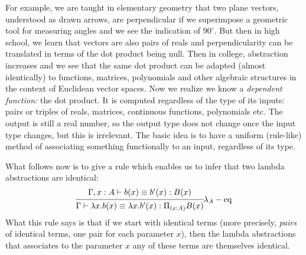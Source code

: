 For example, we are taught in elementary geometry that two plane vectors,
understood as drawn arrows, are perpendicular if we superimpose a geometric
tool for measuring angles and we see the indication of $ 90^\circ $.
But then in high school, we learn that vectors are also pairs of reals
and perpendicularity can be translated in terms of the dot product
being null. Then in college, abstraction increases and we see that the
same dot product can be adapted (almost identically) to functions, matrices,
polynomials and other algebraic structures in the context of Euclidean
vector spaces. Now we realize we know a \emph{dependent function:} the
dot product. It is computed  regardless of the
type of its inputs: pairs or triples of reals, matrices, continuous
functions, polynomials etc. The output is still a real number, so the
output type does not change once the input type changes, but this is
irrelevant. The basic idea is to have a uniform (rule-like) method of
associating something functionally to an input, regardless of its type.

What follows now is to give a rule which enables us to infer that two
lambda abstractions are identical:
\[
  \begin{prooftree}
    \hypo{\Gamma, x : A \vdash b(x) \equiv b'(x) : B(x)}
    \infer1{\Gamma \vdash \lambda x . b(x) \equiv %
      \lambda x . b'(x) : \Pi_{(x : A)} B(x)}
  \end{prooftree}\lambda_A-\text{eq}
\]
What this rule says is that if we start with identical terms (more
precisely, \emph{pairs} of identical terms, one pair for each
parameter $ x $), then the lambda abstractions that associates to
the parameter $ x $ any of these terms are themselves identical.

